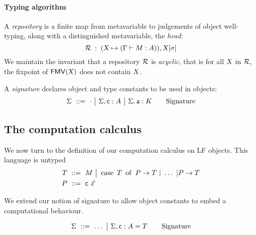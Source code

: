 \documentclass[9pt]{sigplanconf}
\begin{document}
\paragraph{Typing algorithm}

A \emph{repository}
is a finite map from metavariable to judgements of object well-typing,
along with a distinguished metavariable, the \emph{head}:
$$ \mathcal{R}\;:\;(\text{\textsl{X}} \mapsto (\Gamma\vdash{M}:{A})), {\text{\textsl{X}}}[{\sigma}] $$
We maintain the invariant that a repository $\mathcal{R}$ is
\emph{acyclic}, that is for all $\text{\textsl{X}}$ in $\mathcal{R}$, the fixpoint
of ${\rm\mathsf{FMV}}({\text{\textsl{X}}})$ does not contain $\text{\textsl{X}}$.

A \emph{signature} declares object and type constants to be used in
objects:
$$  \Sigma \ ::=\ 
  \cdot \ {\big|}\ 
  {\Sigma},{\text{\textsf{c}} : A} \ {\big|}\ 
  {\Sigma},{\text{\textsf{a}} : K} \qquad
  \text{Signature}
$$

\subsection{The computation calculus}

We now turn to the definition of our computation calculus on LF
objects. This language is untyped
\begin{align*}
  T &\ ::=\ 
   M \ {\big|}\ 
  \operatorname{case}\ {T}\ \operatorname{of}\  {P}\to T\ |\ \ldots\ |{P}\to T \\
  P &\ ::=\  {\text{\textsf{c}}}\  {\vec x}
\end{align*}

We extend our notion of signature to allow object constants to embed a
computational behaviour.

$$  \Sigma \ ::=\ 
  \ldots \ {\big|}\ 
  {\Sigma},{\text{\textsf{c}} : A = T}
  \qquad
  \text{Signature}
$$







\end{document}
